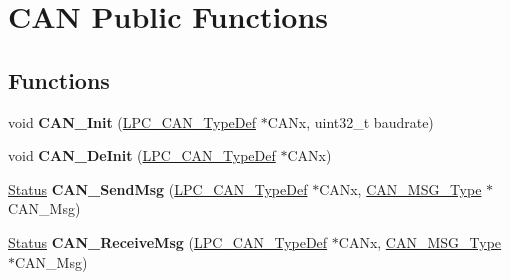 \hypertarget{group___c_a_n___public___functions}{\section{\-C\-A\-N \-Public \-Functions}
\label{group___c_a_n___public___functions}
}
\subsection*{\-Functions}
\begin{DoxyCompactItemize}
\item 
\hypertarget{group___c_a_n___public___functions_ga2605eb2d985f919e2b591f6472a69c0a}{void {\bfseries \-C\-A\-N\-\_\-\-Init} (\hyperlink{struct_l_p_c___c_a_n___type_def}{\-L\-P\-C\-\_\-\-C\-A\-N\-\_\-\-Type\-Def} $\ast$\-C\-A\-Nx, uint32\-\_\-t baudrate)}\label{group___c_a_n___public___functions_ga2605eb2d985f919e2b591f6472a69c0a}

\item 
\hypertarget{group___c_a_n___public___functions_gacc6704904f2113d09f50a13ecdcc6c76}{void {\bfseries \-C\-A\-N\-\_\-\-De\-Init} (\hyperlink{struct_l_p_c___c_a_n___type_def}{\-L\-P\-C\-\_\-\-C\-A\-N\-\_\-\-Type\-Def} $\ast$\-C\-A\-Nx)}\label{group___c_a_n___public___functions_gacc6704904f2113d09f50a13ecdcc6c76}

\item 
\hypertarget{group___c_a_n___public___functions_gaea0b9965302bb6d9c7c69bd1d469d3c7}{\hyperlink{group___l_p_c___types___public___types_ga67a0db04d321a74b7e7fcfd3f1a3f70b}{\-Status} {\bfseries \-C\-A\-N\-\_\-\-Send\-Msg} (\hyperlink{struct_l_p_c___c_a_n___type_def}{\-L\-P\-C\-\_\-\-C\-A\-N\-\_\-\-Type\-Def} $\ast$\-C\-A\-Nx, \hyperlink{struct_c_a_n___m_s_g___type}{\-C\-A\-N\-\_\-\-M\-S\-G\-\_\-\-Type} $\ast$\-C\-A\-N\-\_\-\-Msg)}\label{group___c_a_n___public___functions_gaea0b9965302bb6d9c7c69bd1d469d3c7}

\item 
\hypertarget{group___c_a_n___public___functions_gaf1614bb41e342589df7b610f3e90be33}{\hyperlink{group___l_p_c___types___public___types_ga67a0db04d321a74b7e7fcfd3f1a3f70b}{\-Status} {\bfseries \-C\-A\-N\-\_\-\-Receive\-Msg} (\hyperlink{struct_l_p_c___c_a_n___type_def}{\-L\-P\-C\-\_\-\-C\-A\-N\-\_\-\-Type\-Def} $\ast$\-C\-A\-Nx, \hyperlink{struct_c_a_n___m_s_g___type}{\-C\-A\-N\-\_\-\-M\-S\-G\-\_\-\-Type} $\ast$\-C\-A\-N\-\_\-\-Msg)}\label{group___c_a_n___public___functions_gaf1614bb41e342589df7b610f3e90be33}


\end{DoxyCompactItemize}
